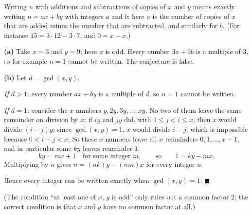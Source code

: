 Writing $n$ with additions and subtractions of copies of $x$ and $y$ means exactly writing $n=ax+by$ with integers $a$ and $b$: here $a$ is the number of copies of $x$ that are added minus the number that are subtracted, and similarly for $b$. (For instance $15=3\cdot12-3\cdot7$, and $0=x-x$.)

\textbf{(a)} Take $x=3$ and $y=9$; here $x$ is odd. Every number $3a+9b$ is a multiple of $3$, so for example $n=1$ cannot be written. The conjecture is false.

\textbf{(b)} Let $d=\gcd(x,y)$.

\emph{If $d>1$:} every number $ax+by$ is a multiple of $d$, so $n=1$ cannot be written.

\emph{If $d=1$:} consider the $x$ numbers $y,2y,3y,\dots,xy$. No two of them leave the same remainder on division by $x$: if $iy$ and $jy$ did, with $1\le j<i\le x$, then $x$ would divide $(i-j)y$; since $\gcd(x,y)=1$, $x$ would divide $i-j$, which is impossible because $0<i-j<x$. So these $x$ numbers leave all $x$ remainders $0,1,\dots,x-1$, and in particular some $ky$ leaves remainder $1$:
\[ky=mx+1\quad\text{for some integer }m,\qquad\text{so}\qquad 1=ky-mx.\]
Multiplying by $n$ gives $n=(nk)y-(nm)x$ for every integer $n$.

Hence every integer can be written exactly when $\gcd(x,y)=1$. $\blacksquare$

(The condition ``at least one of $x$, $y$ is odd'' only rules out a common factor $2$; the correct condition is that $x$ and $y$ have no common factor at all.)
